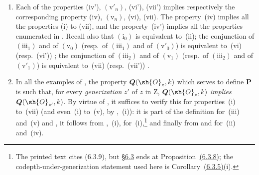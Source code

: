 \begin{remarks}[7.3.9]
\label{IV.7.3.9}
\begin{enumerate}[label=\emph{\roman*)}]
  \item Each of the properties (iv'), $(\mathrm{v}'_n)$, (vi'), (vii') implies respectively the corresponding property (iv), $(\mathrm{v}_n)$, (vi), (vii).
  The property~(iv) implies all the properties (i) to (vii), and the property~(iv') implies all the properties enumerated in .
  Recall also that $(\mathrm{i}_0)$ is equivalent to~(ii); the conjunction of $(\mathrm{iii}_1)$ and of $(\mathrm{v}_0)$ (resp.~of $(\mathrm{iii}_1)$ and of $(\mathrm{v}'_0)$) is equivalent to~(vi) (resp.~(vi')) ; the conjunction of $(\mathrm{iii}_2)$ and of $(\mathrm{v}_1)$ (resp.~of $(\mathrm{iii}_2)$ and of $(\mathrm{v}'_1)$) is equivalent to~(vii) (resp.~(vii')) .

  \item In all the examples of , the property $\boldsymbol{Q}(\sh{O}_z,k)$ which serves to define $\boldsymbol{P}$ is such that, for every \emph{generization} $z'$ of $z$ in $\mathrm{Z}$, $\boldsymbol{Q}(\sh{O}_z,k)$ \emph{implies} $\boldsymbol{Q}(\sh{O}_{z'},k)$.
  By virtue of , it suffices to verify this for properties~(i) to~(vii) (and even~(i) to~(v), by ,~(i)): it is part of the definition for~(iii) and~(v)  and , it follows from ,~(i), for~(i),\footnote{The printed text cites (6.3.9), but {\hyperlink{ega4.c04.subsec.6-3}{\S6.3}} ends at Proposition~{\hyperlink{ega4.c04.prop.6-3-8}{(6.3.8)}}; the codepth-under-generization statement used here is Corollary~{\hyperlink{ega4.c04.cor.6-3-5}{(6.3.5)}}(i).} and finally from  and  for~(ii) and~(iv).
\end{enumerate}
\end{remarks}


